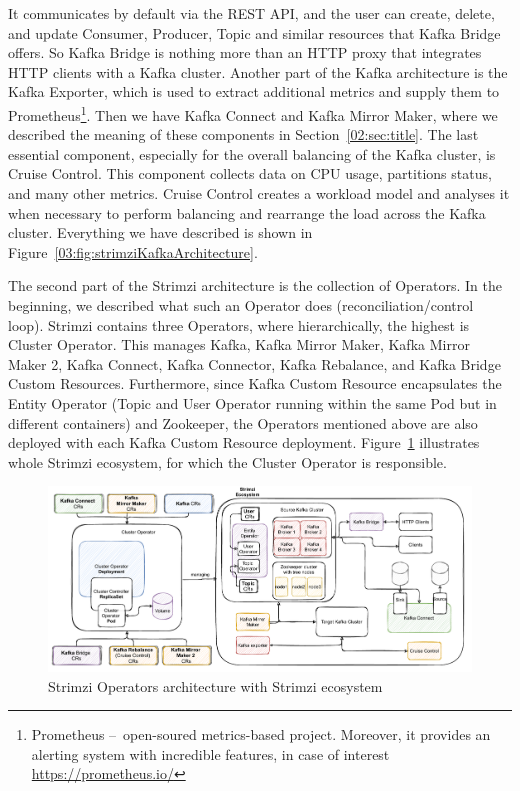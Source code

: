 It communicates by default via the REST API, and the user can create, delete, and update Consumer, Producer, Topic and similar resources that Kafka Bridge offers.
So Kafka Bridge is nothing more than an HTTP proxy that integrates HTTP clients with a Kafka cluster.
Another part of the Kafka architecture is the Kafka Exporter, which is used to extract additional metrics and supply them to Prometheus\footnote{Prometheus \---\ open-soured metrics-based project. Moreover, it provides an alerting system with incredible features, in case of interest \url{https://prometheus.io/}}.
Then we have Kafka Connect and Kafka Mirror Maker, where we described the meaning of these components in Section~\ref{02:sec:title}.
The last essential component, especially for the overall balancing of the Kafka cluster, is Cruise Control.
This component collects data on CPU usage, partitions status, and many other metrics.
Cruise Control creates a workload model and analyses it when necessary to perform balancing and rearrange the load across the Kafka cluster.
Everything we have described is shown in Figure~\ref{03:fig:strimziKafkaArchitecture}.

The second part of the Strimzi architecture is the collection of Operators.
In the beginning, we described what such an Operator does (reconciliation/control loop).
Strimzi contains three Operators, where hierarchically, the highest is Cluster Operator.
This manages Kafka, Kafka Mirror Maker, Kafka Mirror Maker 2, Kafka Connect, Kafka Connector, Kafka Rebalance, and Kafka Bridge Custom Resources.
Furthermore, since Kafka Custom Resource encapsulates the Entity Operator (Topic and User Operator running within the same Pod but in different containers) and Zookeeper, the Operators mentioned above are also deployed with each Kafka Custom Resource deployment.
Figure~\ref{03:fig:strimziOperatorsArchitecture} illustrates whole Strimzi ecosystem, for which the Cluster Operator is responsible.

\begin{figure}[!ht]
    \centering
    \includegraphics[scale=0.55]{obrazky-figures/02-preliminaries/03-strimzi/04-stirmziOperatorsArch}
    \caption{Strimzi Operators architecture with Strimzi ecosystem}
    \label{03:fig:strimziOperatorsArchitecture}
\end{figure}

